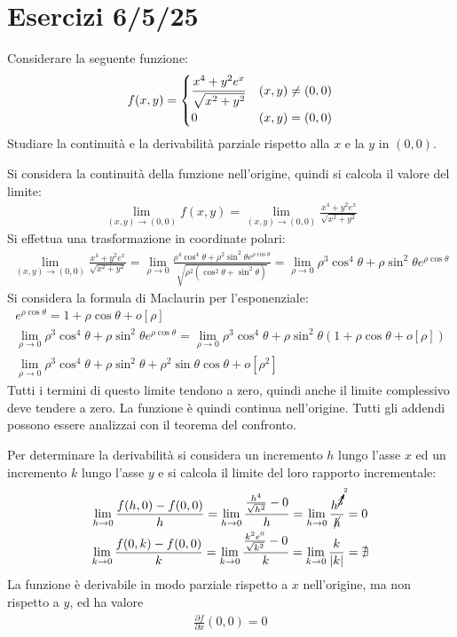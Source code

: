 \documentclass{article}
\numberwithin{equation}{subsection}
\begin{document}
\clearpage

\section{Esercizi 6/5/25}

Considerare la seguente funzione:
\begin{gather*}
    f(x,y)=\begin{cases}
        \displaystyle\frac{\strut x^4+y^2e^x}{\strut\sqrt{x^2+y^2}}&(x,y)\neq(0,0)\\
        0&(x,y)=(0,0)
    \end{cases}
\end{gather*}
Studiare la continuità e la derivabilità parziale rispetto alla $x$ e la $y$ in $(0,0)$. 

Si considera la continuità della funzione nell'origine, quindi si calcola il valore del limite:
\begin{gather*}
    \lim_{(x,y)\to(0,0)}f(x,y)=\lim_{(x,y)\to(0,0)}\displaystyle\frac{x^4+y^2e^x}{\sqrt{x^2+y^2}}
\end{gather*}
Si effettua una trasformazione in coordinate polari:
\begin{gather*}
    \lim_{(x,y)\to(0,0)}\displaystyle\frac{x^4+y^2e^x}{\sqrt{x^2+y^2}}=
    \lim_{\rho\to0}\frac{\rho^4\cos^4\theta+\rho^2\sin^2\theta e^{\rho\cos\theta}}{\sqrt{\rho^2(\cos^2\theta+\sin^2\theta)}}=
    \lim_{\rho\to0}{\rho^3\cos^4\theta+\rho\sin^2\theta e^{\rho\cos\theta}}    
\end{gather*}
Si considera la formula di Maclaurin per l'esponenziale:
\begin{gather*}
    e^{\rho\cos\theta}=1+\rho\cos\theta+o[\rho]\\
    \lim_{\rho\to0}{\rho^3\cos^4\theta+\rho\sin^2\theta e^{\rho\cos\theta}}=
    \lim_{\rho\to0}{\rho^3\cos^4\theta+\rho\sin^2\theta (1+\rho\cos\theta+o[\rho])}\\
    \lim_{\rho\to0}\rho^3\cos^4\theta+\rho\sin^2\theta+\rho^2\sin\theta\cos\theta+o[\rho^2]    
\end{gather*}
Tutti i termini di questo limite tendono a zero, quindi anche il limite complessivo deve tendere a zero. La funzione è quindi continua nell'origine. Tutti gli addendi possono essere analizzai con il teorema del confronto. 

Per determinare la derivabilità si considera un incremento $h$ lungo l'asse $x$ ed un incremento $k$ lungo l'asse $y$ e si calcola il limite del loro rapporto incrementale:
\begin{gather*}
    \lim_{h\to0}\frac{f(h,0)-f(0,0)}{h}=
    \lim_{h\to0}\frac{\frac{h^4}{\sqrt{h^2}}-0}{h}=
    \lim_{h\to0}\frac{h^{\cancelto{2}{3}}}{\cancel{h}}=0\\
    \lim_{k\to0}\frac{f(0,k)-f(0,0)}{k}=
    \lim_{k\to0}\frac{\frac{k^2e^0}{\sqrt{k^2}}-0}{k}=
    \lim_{k\to0}\frac{k}{|k|}=\nexists
\end{gather*}
La funzione è derivabile in modo parziale rispetto a $x$ nell'origine, ma non rispetto a $y$, ed ha valore
\begin{gather*}
    \displaystyle\frac{\partial f}{\partial x}(0,0)=0
\end{gather*}
\end{document}
